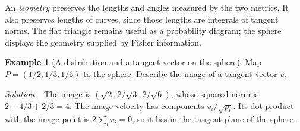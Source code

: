 \documentclass[11pt,oneside,openany]{book}
\theoremstyle{definition}
\newtheorem{example}{Example}[chapter]
\theoremstyle{remark}
\newenvironment{solution}{\par\smallskip\noindent\textit{Solution.}\ }{\par\smallskip}
\numberwithin{equation}{chapter}
\begin{document}
An \emph{isometry} preserves the lengths and angles measured by the two metrics. It also preserves lengths of curves, since those lengths are integrals of tangent norms. The flat triangle remains useful as a probability diagram; the sphere displays the geometry supplied by Fisher information.

\begin{example}[A distribution and a tangent vector on the sphere]
Map $P=(1/2,1/3,1/6)$ to the sphere. Describe the image of a tangent vector $v$.
\begin{solution}
The image is $(\sqrt2,2/\sqrt3,2/\sqrt6)$, whose squared norm is $2+4/3+2/3=4$. The image velocity has components $v_i/\sqrt{p_i}$. Its dot product with the image point is $2\sum_i v_i=0$, so it lies in the tangent plane of the sphere.
\end{solution}
\end{example}
\end{document}
